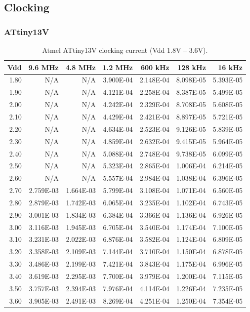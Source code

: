 \subsection{Clocking}


\subsubsection*{ATtiny13V}

\begin{table}
\begin{centering}
\begin{tabular}{|r|r|r|r|r|r|r|}
\hline
Vdd  & 9.6 MHz  & 4.8 MHz  & 1.2 MHz  & 600 kHz  & 128 kHz  & 16 kHz\tabularnewline
\hline
1.80  & N/A  & N/A  & 3.900E-04  & 2.148E-04  & 8.098E-05  & 5.393E-05 \tabularnewline
1.90  & N/A  & N/A  & 4.121E-04  & 2.258E-04  & 8.387E-05  & 5.499E-05 \tabularnewline
2.00  & N/A  & N/A  & 4.242E-04  & 2.329E-04  & 8.708E-05  & 5.608E-05 \tabularnewline
2.10  & N/A  & N/A  & 4.429E-04  & 2.421E-04  & 8.897E-05  & 5.721E-05 \tabularnewline
2.20  & N/A  & N/A  & 4.634E-04  & 2.523E-04  & 9.126E-05  & 5.839E-05 \tabularnewline
2.30  & N/A  & N/A  & 4.859E-04  & 2.632E-04  & 9.415E-05  & 5.964E-05 \tabularnewline
2.40  & N/A  & N/A  & 5.088E-04  & 2.748E-04  & 9.738E-05  & 6.099E-05 \tabularnewline
2.50  & N/A  & N/A  & 5.323E-04  & 2.865E-04  & 1.006E-04  & 6.214E-05 \tabularnewline
2.60  & N/A  & N/A  & 5.557E-04  & 2.984E-04  & 1.038E-04  & 6.396E-05 \tabularnewline
2.70  & 2.759E-03  & 1.664E-03  & 5.799E-04  & 3.108E-04  & 1.071E-04  & 6.560E-05 \tabularnewline
2.80  & 2.879E-03  & 1.742E-03  & 6.065E-04  & 3.235E-04  & 1.102E-04  & 6.743E-05 \tabularnewline
2.90  & 3.001E-03  & 1.834E-03  & 6.384E-04  & 3.366E-04  & 1.136E-04  & 6.926E-05 \tabularnewline
3.00  & 3.116E-03  & 1.945E-03  & 6.705E-04  & 3.540E-04  & 1.174E-04  & 7.100E-05 \tabularnewline
3.10  & 3.231E-03  & 2.022E-03  & 6.876E-04  & 3.582E-04  & 1.124E-04  & 6.809E-05 \tabularnewline
3.20  & 3.358E-03  & 2.109E-03  & 7.144E-04  & 3.710E-04  & 1.150E-04  & 6.878E-05 \tabularnewline
3.30  & 3.486E-03  & 2.199E-03  & 7.421E-04  & 3.843E-04  & 1.175E-04  & 6.996E-05 \tabularnewline
3.40  & 3.619E-03  & 2.295E-03  & 7.700E-04  & 3.979E-04  & 1.200E-04  & 7.115E-05 \tabularnewline
3.50  & 3.757E-03  & 2.394E-03  & 7.976E-04  & 4.114E-04  & 1.226E-04  & 7.235E-05 \tabularnewline
3.60  & 3.905E-03  & 2.491E-03  & 8.269E-04  & 4.251E-04  & 1.250E-04  & 7.354E-05 \tabularnewline
\hline
\end{tabular}
\par\end{centering}

\protect\caption{Atmel ATtiny13V clocking current (Vdd 1.8V -- 3.6V).}


\end{table}
